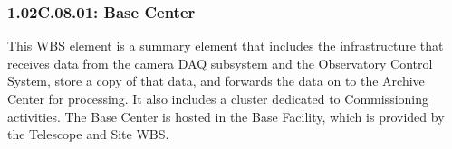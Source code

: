 \subsubsection{1.02C.08.01: Base Center}

This WBS element is a summary element that includes the infrastructure that
receives data from the camera DAQ subsystem and the Observatory Control
System, store a copy of that data, and forwards the data on to the Archive
Center for processing. It also includes a cluster dedicated to Commissioning
activities. The Base Center is hosted in the Base Facility, which is provided
by the Telescope and Site WBS.

